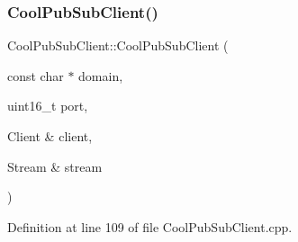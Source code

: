 \subsubsection{\texorpdfstring{Cool\+Pub\+Sub\+Client()}{CoolPubSubClient()}\hspace{0.1cm}{\footnotesize\ttfamily [12/14]}}
{\footnotesize\ttfamily Cool\+Pub\+Sub\+Client\+::\+Cool\+Pub\+Sub\+Client (\begin{DoxyParamCaption}\item[{const char $\ast$}]{domain,  }\item[{uint16\+\_\+t}]{port,  }\item[{Client \&}]{client,  }\item[{Stream \&}]{stream }\end{DoxyParamCaption})}



Definition at line 109 of file Cool\+Pub\+Sub\+Client.\+cpp.


